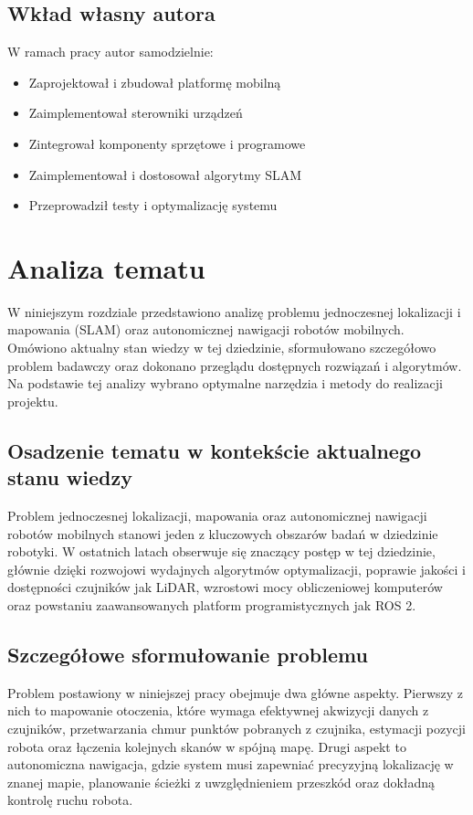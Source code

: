 \documentclass[a4paper,twoside,12pt]{book}
\begin{document}
\section{Wkład własny autora}
W ramach pracy autor samodzielnie:
\begin{itemize}
\item Zaprojektował i zbudował platformę mobilną
\item Zaimplementował sterowniki urządzeń
\item Zintegrował komponenty sprzętowe i programowe
\item Zaimplementował i dostosował algorytmy SLAM
\item Przeprowadził testy i optymalizację systemu
\end{itemize}



\chapter{Analiza tematu}
\label{ch:Analiza-Tematu}
W niniejszym rozdziale przedstawiono analizę problemu jednoczesnej lokalizacji i mapowania (SLAM) oraz autonomicznej nawigacji robotów mobilnych. Omówiono aktualny stan wiedzy w tej dziedzinie, sformułowano szczegółowo problem badawczy oraz dokonano przeglądu dostępnych rozwiązań i algorytmów. Na podstawie tej analizy wybrano optymalne narzędzia i metody do realizacji projektu.

\section{Osadzenie tematu w kontekście aktualnego stanu wiedzy}
Problem jednoczesnej lokalizacji, mapowania oraz autonomicznej nawigacji robotów mobilnych stanowi jeden z kluczowych obszarów badań w dziedzinie robotyki. W ostatnich latach obserwuje się znaczący postęp w tej dziedzinie, głównie dzięki rozwojowi wydajnych algorytmów optymalizacji, poprawie jakości i dostępności czujników jak LiDAR, wzrostowi mocy obliczeniowej komputerów oraz powstaniu zaawansowanych platform programistycznych jak ROS 2.

\section{Szczegółowe sformułowanie problemu}
Problem postawiony w niniejszej pracy obejmuje dwa główne aspekty. Pierwszy z nich to mapowanie otoczenia, które wymaga efektywnej akwizycji danych z czujników, przetwarzania chmur punktów pobranych z czujnika, estymacji pozycji robota oraz łączenia kolejnych skanów w spójną mapę. Drugi aspekt to autonomiczna nawigacja, gdzie system musi zapewniać precyzyjną lokalizację w znanej mapie, planowanie ścieżki z uwzględnieniem przeszkód oraz dokładną kontrolę ruchu robota.
\end{document}
